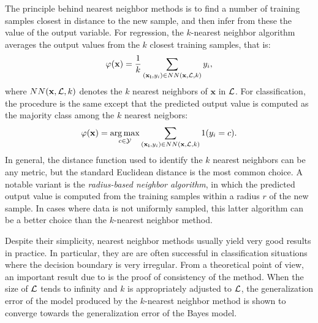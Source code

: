 The principle behind nearest neighbor methods is to find a number of
training samples closest in distance to the new sample, and then infer from
these the value of the output variable. For regression, the $k$-nearest
neighbor algorithm~\citep{fix:1951} averages the output values from the $k$
closest training samples, that is:
\begin{equation}
\varphi(\mathbf{x}) = \frac{1}{k} \sum_{(\mathbf{x_i}, y_i) \in NN(\mathbf{x}, {\cal L}, k)} y_i,
\end{equation}
where $NN(\mathbf{x}, {\cal L}, k)$ denotes the $k$ nearest neighbors of ${\mathbf{x}}$ in ${\cal L}$.
For classification, the procedure is the same except that the predicted
output value is computed as the majority class among the $k$ nearest neigbors:
\begin{equation}
\varphi(\mathbf{x}) = \operatorname*{arg\,max}_{c \in {\cal Y}} \sum_{(\mathbf{x_i}, y_i) \in NN(\mathbf{x}, {\cal L}, k)} 1(y_i = c).
\end{equation}
In general, the distance function used to identify the $k$ nearest neighbors
can be any metric, but the standard Euclidean distance is the most common
choice. A notable variant is the
\textit{radius-based neighbor algorithm}, in which the predicted output value
is computed from the training samples within a radius $r$ of the new sample.
In cases where data is not uniformly sampled, this latter algorithm can be
a better choice than the $k$-nearest neighbor method.

Despite their simplicity, nearest neighbor methods usually yield very good
results in practice. In particular, they are are often successful in
classification situations where the decision boundary is very irregular. From a
theoretical point of view, an important result due to \citet{cover:1967} is the
proof of consistency of the method. When the size of ${\cal L}$ tends to
infinity and $k$ is appropriately adjusted to ${\cal L}$, the generalization
error of the model produced by the $k$-nearest neighbor method is shown to
converge towards the generalization error of the Bayes model.
